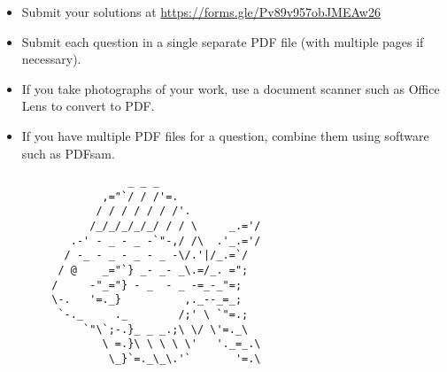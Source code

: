 \documentclass{article}
\begin{document}
\vfill
\small
\begin{itemize}
	\item Submit your solutions at \href{https://forms.gle/Pv89v957obJMEAw26}{https://forms.gle/Pv89v957obJMEAw26}
	\item Submit each question in a single separate PDF file (with multiple pages if necessary).
	\item If you take photographs of your work, use a document scanner such as Office Lens to convert to PDF.
	\item If you have multiple PDF files for a question, combine them using software such as PDFsam.
\end{itemize}

\vfill
\centering
\small
\begin{BVerbatim}
                    _ _ _
                ,="`/ / /'=.
               / / / / / / /'.
              /_/_/_/_/_/ / / \     _.='/
           .-' - _ - _ -`"-,/ /\  .'_.='/
          / -_ - _ - _ - _ -\/.'|/_.=`/
         / @    _="`} _- _- _\.=/_. =";
        /     -"_="} - _  - _ -=_-_"=;
        \-.   '=._}          ,._--_=_;
         `-._     ._        /;' \ `"=.;
             `"\`;-.}_ _ _.;\ \/ \'=._\
                \ =.}\ \ \ \ \'   '._=_.\
                 \_}`=._\_\.'`       '=.\
\end{BVerbatim}
\end{document}
